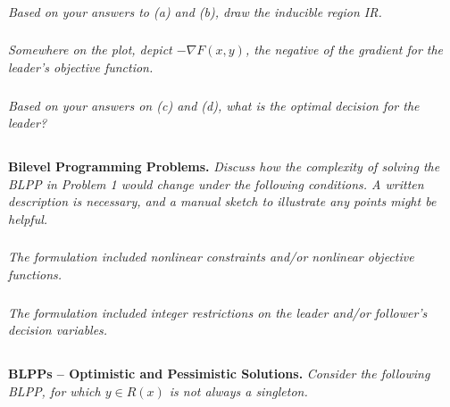 \documentclass[12pt]{amsart}
\begin{document}
\subsubsection{}
\textit{Based on your answers to (a) and (b), draw the inducible region IR.}

\subsubsection{}
\textit{Somewhere on the plot, depict $-\nabla F(x,y)$, the negative of the gradient for the leader’s objective function.}

\subsubsection{}
\textit{Based on your answers on (c) and (d), what is the optimal decision for the leader?}




\subsection{}
\textbf{Bilevel Programming Problems.} 
\textit{Discuss how the complexity of solving the BLPP in Problem 1 would change under the following conditions. A written description is necessary, and a manual sketch to illustrate any points might be helpful.}

% 
% 

\subsubsection{}
\textit{The formulation included nonlinear constraints and/or nonlinear objective functions.}

\subsubsection{}
\textit{The formulation included integer restrictions on the leader and/or follower’s decision variables.}



\subsection{}
\textbf{BLPPs – Optimistic and Pessimistic Solutions.} 
\textit{Consider the following BLPP, for which $y\in R(x)$ is not always a singleton.}
\end{document}
